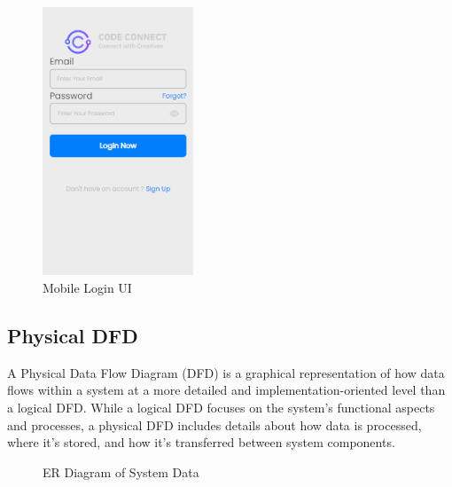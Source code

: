 \begin{figure}[H]
  \centering
  \includegraphics[height = 8cm]{ui_diagrams/mobile_login.png}
  \caption{Mobile Login UI}
\end{figure}
\newpage
\subsection{Physical DFD}
A Physical Data Flow Diagram (DFD) is a graphical representation of how data flows within a system at a more detailed and implementation-oriented level than a logical DFD. While a logical DFD focuses on the system's functional aspects and processes, a physical DFD includes details about how data is processed, where it's stored, and how it's transferred between system components.
\begin{figure}[H]
  \caption{ER Diagram of System Data}
\end{figure}
\newpage